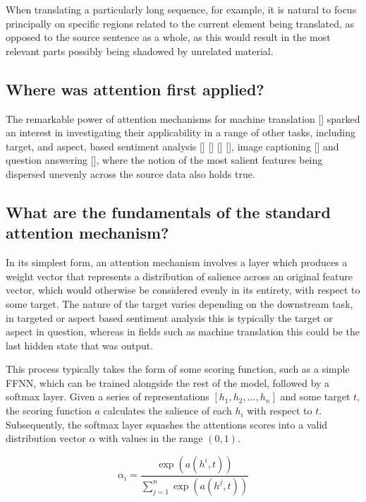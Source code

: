 \documentclass[12pt, a4paper]{report}
\theoremstyle{definition}
\theoremstyle{definition}%
\theoremstyle{definition}%
\theoremstyle{definition}%
\theoremstyle{definition}%
\theoremstyle{definition}%
\renewcommand{\cite}[1]{[\citealp{#1}]}
\begin{document}
When translating a particularly long sequence, for example, it is natural to focus principally on specific regions related to the current element being translated, as opposed to the source sentence as a whole, as this would result in the most relevant parts possibly being shadowed by unrelated material. 

\subsection{Where was attention first applied?}
The remarkable power of attention mechanisms for machine translation \cite{bahdanau2014} sparked an interest in investigating their applicability in a range of other tasks, including target, and aspect, based sentiment analysis \cite{wang} \cite{chen2017} \cite{dehongma2017} \cite{zheng2018}, image captioning \cite{kelvinxu2015} and question answering \cite{hermann2015}, where the notion of the most salient features being dispersed unevenly across the source data also holds true. 

\subsection{What are the fundamentals of the standard attention mechanism?}
In its simplest form, an attention mechanism involves a layer which produces a weight vector that represents a distribution of salience across an original feature vector, which would otherwise be considered evenly in its entirety, with respect to some target. The nature of the target varies depending on the downstream task, in targeted or aspect based sentiment analysis this is typically the target or aspect in question, whereas in fields such as machine translation this could be the last hidden state that was output.   

This process typically takes the form of some scoring function, such as a simple FFNN, which can be trained alongside the rest of the model, followed by a softmax layer. Given a series of representations $[h_{1}, h_{2}, ..., h_{n}]$ and some target $t$, the scoring function $a$ calculates the salience of each $h_{i}$ with respect to $t$. Subsequently, the softmax layer squashes the attentions scores into a valid distribution vector $\alpha$ with values in the range $(0, 1)$. 

\begin{equation} \label{eq:attention_alignment_model}
    \alpha_{i} = \frac{\exp(a(h^{i},t))}{\sum_{j=1}^{n}\exp(a(h^{j},t))}
\end{equation}
\end{document}
